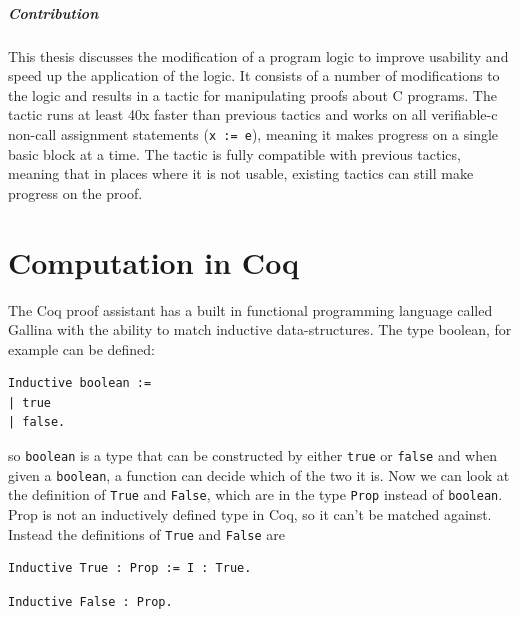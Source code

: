 \documentclass{puthesis}
\begin{document}
\paragraph{Contribution}
This thesis discusses the modification of a program logic to improve
usability and speed up the application of the logic. It consists of a
number of modifications to the logic and results in a tactic for
manipulating proofs about C programs. The tactic runs at least 40x
faster than previous tactics and works on all verifiable-c non-call
assignment statements (\lstinline|x := e|), meaning it makes progress
on a single basic block at a time. The tactic is fully compatible with
previous tactics, meaning that in places where it is not usable,
existing tactics can still make progress on the proof.

\chapter{Computation in Coq}

The Coq proof assistant has a built in functional programming language
called Gallina with the ability to match inductive data-structures. The type
boolean, for example can be defined:

\begin{verbatim}
Inductive boolean :=
| true
| false.
\end{verbatim}

so \lstinline|boolean| is a type that can be constructed by either
\lstinline|true| or \lstinline|false| and when given a
\lstinline|boolean|, a function can decide which of the two it is. Now
we can look at the definition of \lstinline|True| and
\lstinline|False|, which are in the type
\lstinline|Prop| instead of \lstinline|boolean|. Prop is not an
inductively defined type in Coq, so it can't be matched
against. Instead the definitions of \lstinline|True| and \lstinline|False|
are

\begin{verbatim}
Inductive True : Prop := I : True.
\end{verbatim}
\begin{verbatim}
Inductive False : Prop.
\end{verbatim}
\end{document}
